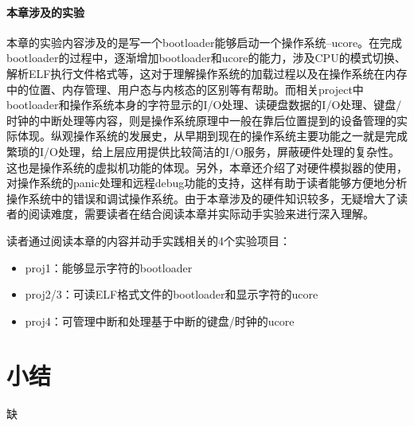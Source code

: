 \paragraph{本章涉及的实验}

本章的实验内容涉及的是写一个bootloader能够启动一个操作系统--ucore。在完成bootloader的过程中，逐渐增加bootloader和ucore的能力，涉及CPU的模式切换、解析ELF执行文件格式等，这对于理解操作系统的加载过程以及在操作系统在内存中的位置、内存管理、用户态与内核态的区别等有帮助。而相关project中bootloader和操作系统本身的字符显示的I/O处理、读硬盘数据的I/O处理、键盘/时钟的中断处理等内容，则是操作系统原理中一般在靠后位置提到的设备管理的实际体现。纵观操作系统的发展史，从早期到现在的操作系统主要功能之一就是完成繁琐的I/O处理，给上层应用提供比较简洁的I/O服务，屏蔽硬件处理的复杂性。这也是操作系统的虚拟机功能的体现。另外，本章还介绍了对硬件模拟器的使用，对操作系统的panic处理和远程debug功能的支持，这样有助于读者能够方便地分析操作系统中的错误和调试操作系统。由于本章涉及的硬件知识较多，无疑增大了读者的阅读难度，需要读者在结合阅读本章并实际动手实验来进行深入理解。

读者通过阅读本章的内容并动手实践相关的4个实验项目：

\begin{itemize}
	\item
	proj1：能够显示字符的bootloader
	\item
	proj2/3：可读ELF格式文件的bootloader和显示字符的ucore
	\item
	proj4：可管理中断和处理基于中断的键盘/时钟的ucore
\end{itemize}



























\section{小结}
缺